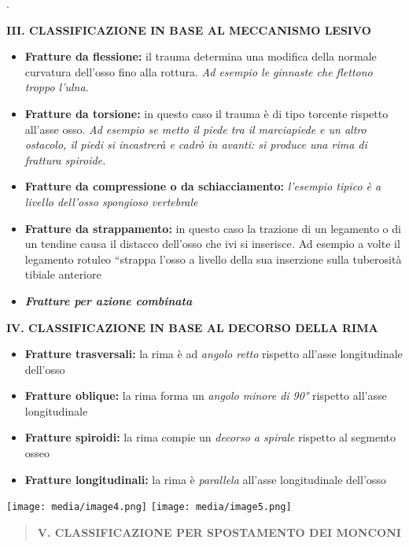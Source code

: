\documentclass[]{article}
\begin{document}
.

\textbf{III. CLASSIFICAZIONE IN BASE AL MECCANISMO LESIVO}

\begin{itemize}
\item
  \textbf{Fratture da flessione:} il trauma determina una modifica della
  normale curvatura dell'osso fino alla rottura. \emph{Ad esempio le
  ginnaste che flettono troppo l'ulna.}
\item
  \textbf{Fratture da torsione:} in questo caso il trauma è di tipo
  torcente rispetto all'asse osso. \emph{Ad esempio se metto il piede
  tra il marciapiede e un altro ostacolo, il piedi si incastrerà e cadrò
  in avanti: si produce una rima di frattura spiroide.}
\item
  \textbf{Fratture da compressione o da schiacciamento:} \emph{l'esempio
  tipico è a livello dell'osso spongioso vertebrale}
\item
  \textbf{Fratture da strappamento:} in questo caso la trazione di un
  legamento o di un tendine causa il distacco dell'osso che ivi si
  inserisce\emph{.} Ad esempio a volte il legamento rotuleo ``strappa
  l'osso a livello della sua inserzione sulla tuberosità tibiale
  anteriore
\item
  \emph{\textbf{Fratture per azione combinata}}
\end{itemize}

\textbf{IV. CLASSIFICAZIONE IN BASE AL DECORSO DELLA RIMA}

\begin{itemize}
\item
  \textbf{Fratture trasversali:} la rima è ad \emph{angolo retto}
  rispetto all'asse longitudinale dell'osso
\item
  \textbf{Fratture oblique:} la rima forma un \emph{angolo minore di
  90°} rispetto all'asse longitudinale
\item
  \textbf{Fratture spiroidi:} la rima compie un \emph{decorso a spirale}
  rispetto al segmento osseo
\item
  \textbf{Fratture longitudinali:} la rima è \emph{parallela} all'asse
  longitudinale dell'osso
\end{itemize}

\texttt{[image: media/image4.png]}
\texttt{[image: media/image5.png]}

\begin{quote}
\textbf{V. CLASSIFICAZIONE PER SPOSTAMENTO DEI MONCONI}
\end{quote}
\end{document}
